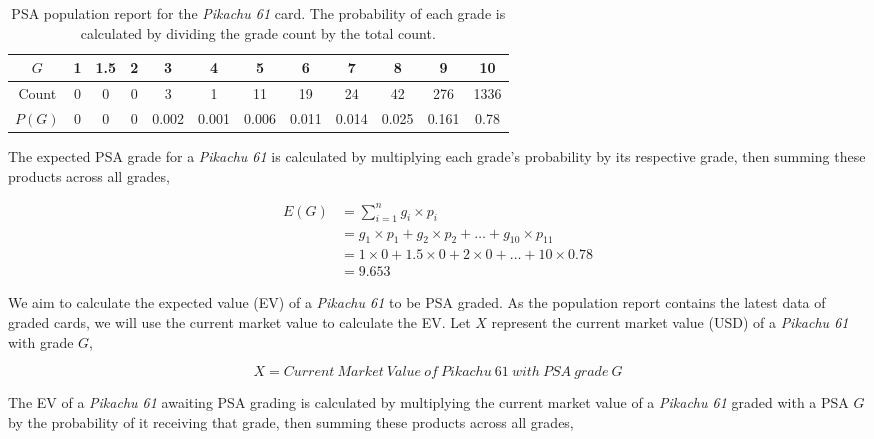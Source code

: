 \documentclass{article}
\begin{document}
\begin{table}[!h]
    \begin{minipage}{\textwidth}
        \begin{center}
            \begin{tabular}{ |c|c|c|c|c|c|c|c|c|c|c|c| } 
                \hline
                $G$ & 1 & 1.5 & 2 & 3 & 4 & 5 & 6 & 7 & 8 & 9 & 10 \\
                \hline
                Count & 0 & 0 & 0 & 3 & 1 & 11 & 19 & 24 & 42 & 276 & 1336 \\
                $P(G)$ & 0 & 0 & 0 & 0.002 & 0.001 & 0.006 & 0.011 & 0.014 & 0.025 & 0.161 & 0.78 \\
                \hline
            \end{tabular}
            \caption{\label{psa-pop-tbl}PSA population report for the \textit{Pikachu 61} card. The probability of each grade is calculated by dividing the grade count by the total count.}
        \end{center}
    \end{minipage}
\end{table}

The expected PSA grade for a \textit{Pikachu 61} is calculated by multiplying each grade's probability by its respective grade, then summing these products across all grades,

\begin{align*}
    E(G) &= \sum_{i = 1}^{n} g_i \times p_i \\
         &= g_1 \times p_1 + g_2 \times p_2 + \dots + g_{10} \times p_{11} \\
         &= 1 \times 0 + 1.5 \times 0 + 2 \times 0 + \dots + 10 \times 0.78 \\
         &= 9.653
\end{align*}

We aim to calculate the expected value (EV) of a \textit{Pikachu 61} to be PSA graded. As the population report contains the latest data of graded cards, we will use the current market value to calculate the EV. Let $X$ represent the current market value (USD) of a \textit{Pikachu 61} with grade $G$,

$$X = Current\ Market\ Value\ of\ Pikachu\ 61\ with\ PSA\ grade\ G$$

The EV of a \textit{Pikachu 61} awaiting PSA grading is calculated by multiplying the current market value of a \textit{Pikachu 61} graded with a PSA $G$ by the probability of it receiving that grade, then summing these products across all grades,
\end{document}
